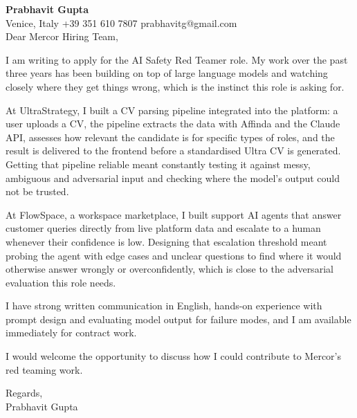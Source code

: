 \documentclass[a4paper,10.5pt]{article}
\begin{document}
\textbf{Prabhavit Gupta}\\
Venice, Italy \textbar{} +39 351 610 7807 \textbar{} prabhavitg@gmail.com\\[10pt]
Dear Mercor Hiring Team,

I am writing to apply for the AI Safety Red Teamer role. My work over the past three years has been building on top of large language models and watching closely where they get things wrong, which is the instinct this role is asking for.

At UltraStrategy, I built a CV parsing pipeline integrated into the platform: a user uploads a CV, the pipeline extracts the data with Affinda and the Claude API, assesses how relevant the candidate is for specific types of roles, and the result is delivered to the frontend before a standardised Ultra CV is generated. Getting that pipeline reliable meant constantly testing it against messy, ambiguous and adversarial input and checking where the model's output could not be trusted.

At FlowSpace, a workspace marketplace, I built support AI agents that answer customer queries directly from live platform data and escalate to a human whenever their confidence is low. Designing that escalation threshold meant probing the agent with edge cases and unclear questions to find where it would otherwise answer wrongly or overconfidently, which is close to the adversarial evaluation this role needs.

I have strong written communication in English, hands-on experience with prompt design and evaluating model output for failure modes, and I am available immediately for contract work.

I would welcome the opportunity to discuss how I could contribute to Mercor's red teaming work.

Regards,\\
Prabhavit Gupta
\end{document}
